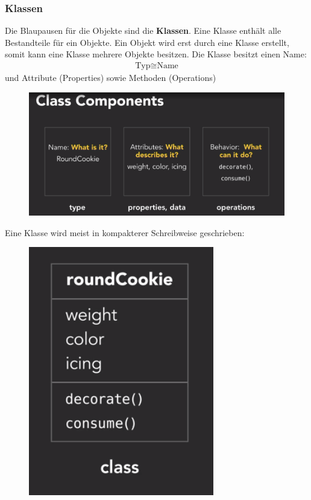 \subsubsection{Klassen}
Die Blaupausen für die Objekte sind die \textbf{Klassen}. Eine Klasse enthält alle Bestandteile für ein Objekte. Ein Objekt wird erst durch eine Klasse erstellt, somit kann eine Klasse mehrere Objekte besitzen. Die Klasse besitzt einen Name:
\begin{align}
	\text{Typ}\cong \text{Name}
\end{align}
und Attribute (Properties) sowie Methoden (Operations)
\begin{figure}[H]
	\centering
	\includegraphics[scale = 0.3]{attachment/chapter_2/Scc004}
	\label{fig:Scc004}
\end{figure}
Eine Klasse wird meist in kompakterer Schreibweise geschrieben:
\begin{figure}[H]
	\centering
	\includegraphics[scale = 0.3]{attachment/chapter_2/Scc006}
	\caption{}
	\label{fig:Scc001}
\end{figure}
